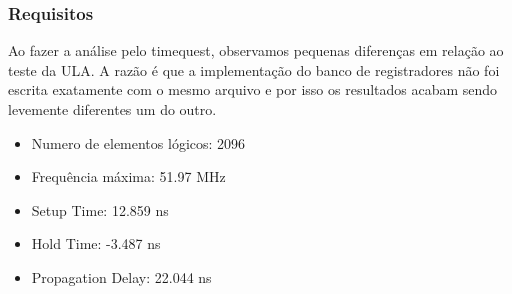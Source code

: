\subsubsection{Requisitos}
Ao fazer a análise pelo timequest, observamos pequenas diferenças em relação ao teste da ULA. A razão é que a implementação do banco de registradores não foi escrita exatamente com o mesmo arquivo e por isso os resultados acabam sendo levemente diferentes um do outro.  
\begin{itemize}
\item Numero de elementos lógicos: 2096
\item Frequência máxima: 51.97 MHz
\item Setup Time: 12.859 ns
\item Hold Time: -3.487 ns
\item Propagation Delay: 22.044 ns
\end{itemize}
